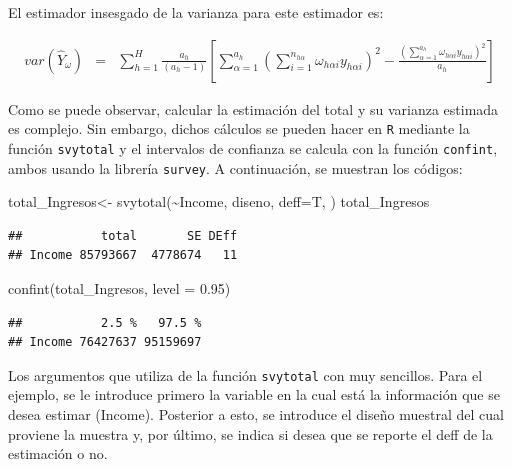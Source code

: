 \documentclass[
  12pt,
]{book}
\newenvironment{Shaded}{\begin{snugshade}}{\end{snugshade}}
\newcommand{\AttributeTok}[1]{\textcolor[rgb]{0.77,0.63,0.00}{#1}}
\newcommand{\FloatTok}[1]{\textcolor[rgb]{0.00,0.00,0.81}{#1}}
\newcommand{\FunctionTok}[1]{\textcolor[rgb]{0.00,0.00,0.00}{#1}}
\newcommand{\NormalTok}[1]{#1}
\newcommand{\OtherTok}[1]{\textcolor[rgb]{0.56,0.35,0.01}{#1}}
\newcommand{\SpecialCharTok}[1]{\textcolor[rgb]{0.00,0.00,0.00}{#1}}
\begin{document}
El estimador insesgado de la varianza para este estimador es:

\begin{eqnarray*}
var\left(\hat{Y}_{\omega}\right) & = & \sum_{h=1}^{H}\frac{a_{h}}{\left(a_{h}-1\right)}\left[\sum_{\alpha=1}^{a_{h}}\left(\sum_{i=1}^{n_{h\alpha}}\omega_{h\alpha i}y_{h\alpha i}\right)^{2}-\frac{\left({\displaystyle \sum_{\alpha=1}^{a_{h}}}\omega_{h\alpha i}y_{h\alpha i}\right)^{2}}{a_{h}}\right]
\end{eqnarray*}

Como se puede observar, calcular la estimación del total y su varianza estimada es complejo. Sin embargo, dichos cálculos se pueden hacer en \texttt{R} mediante la función \texttt{svytotal} y el intervalos de confianza se calcula con la función \texttt{confint}, ambos usando la librería \texttt{survey}. A continuación, se muestran los códigos:

\begin{Shaded}
\begin{Highlighting}[]
\NormalTok{total\_Ingresos}\OtherTok{\textless{}{-}} \FunctionTok{svytotal}\NormalTok{(}\SpecialCharTok{\textasciitilde{}}\NormalTok{Income, diseno, }\AttributeTok{deff=}\NormalTok{T, )}
\NormalTok{total\_Ingresos}
\end{Highlighting}
\end{Shaded}

\begin{verbatim}
##           total       SE DEff
## Income 85793667  4778674   11
\end{verbatim}

\begin{Shaded}
\begin{Highlighting}[]
\FunctionTok{confint}\NormalTok{(total\_Ingresos, }\AttributeTok{level =} \FloatTok{0.95}\NormalTok{)}
\end{Highlighting}
\end{Shaded}

\begin{verbatim}
##           2.5 %   97.5 %
## Income 76427637 95159697
\end{verbatim}

Los argumentos que utiliza de la función \texttt{svytotal} con muy sencillos. Para el ejemplo, se le introduce primero la variable en la cual está la información que se desea estimar (Income). Posterior a esto, se introduce el diseño muestral del cual proviene la muestra y, por último, se indica si desea que se reporte el deff de la estimación o no.
\end{document}
